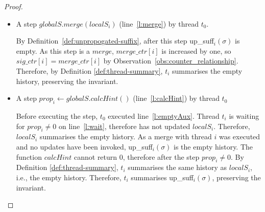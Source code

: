 \begin{proof}
\begin{itemize}
        \item A step $globalS.merge(localS_i)$ (line~\ref{l:merge}) by thread $t_0$.
        
        By Definition~\ref{def:unpropogated-suffix}, after this step up\_suff$_i(\sigma)$ is empty. As
        this step is a $merge$, $merge\_ctr[i]$ is increased by one, so $sig\_ctr[i]=merge\_ctr[i]$ by
        Observation~\ref{obs:counter_relationship}.
        Therefore, by Definition \ref{def:thread-summary}, $t_i$
        summarises the empty history, preserving the invariant.

        \item A step $prop_i \leftarrow globalS.calcHint()$ (line~\ref{l:calcHint}) by thread $t_0$
        
        Before executing the step, $t_0$ executed line~\ref{l:emptyAux}. Thread $t_i$ is waiting
        for $prop_i \neq 0$ on line~\ref{l:wait}, therefore has not updated $localS_i$.
        Therefore, $localS_i$ summarises the empty history.
        As a merge with thread $i$ was executed and no updates have been invoked, up\_suff$_i(\sigma)$
        is the empty history.
        The function $calcHint$ cannot return $0$, therefore after the step $prop_i \neq 0$.
        By Definition \ref{def:thread-summary}, $t_i$ summarises the same history as $localS_i$, i.e., the empty history.
        Therefore, $t_i$ summarises up\_suff$_i(\sigma)$, preserving the invariant.
    \end{itemize}
\end{proof}

